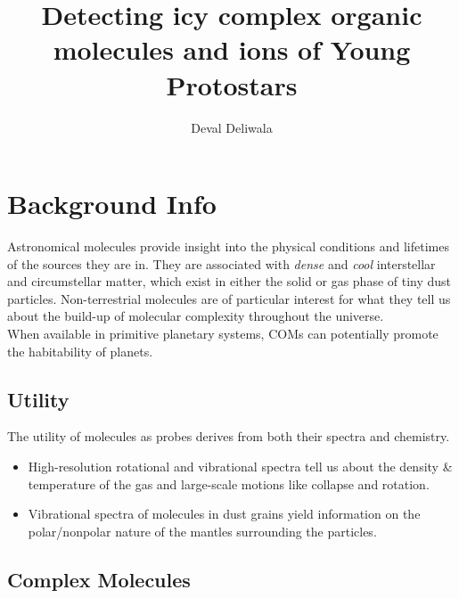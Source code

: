 \documentclass[svgnames]{article}     %
\title{Detecting icy complex organic molecules and ions of Young Protostars}
\author{Deval Deliwala}
\begin{document}
\maketitle
\tableofcontents                     %

\section{Background Info}

Astronomical molecules provide insight into the physical conditions and
lifetimes of the sources they are in. They are associated with \textit{dense}
and \textit{cool} interstellar and circumstellar matter, which exist in either
the solid or gas phase of tiny dust particles. Non-terrestrial molecules are of
particular interest for what they tell us about the build-up of molecular
complexity throughout the universe. \\

When available in primitive planetary systems, COMs can potentially promote the
habitability of planets. 

\subsection{Utility} 

The utility of molecules as probes derives from both their spectra and
chemistry. 

\begin{itemize}
  \item[-] High-resolution rotational and vibrational spectra tell us about the
    density \& temperature of the gas and large-scale motions like
    collapse and rotation. 
  \item[-] Vibrational spectra of molecules in dust grains yield information on
    the polar/nonpolar nature of the mantles surrounding the particles.
\end{itemize}

\subsection{Complex Molecules} 
\end{document}
